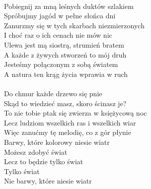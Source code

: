 \documentclass[a5paper, 10pt]{book}
\begin{document}
\begin{minipage}[t]{0.8\textwidth}
  \\
  Pobiegnij za mną leśnych duktów szlakiem\\
  Spróbujmy jagód w pełne słońca dni\\
  Zanurzmy się w tych skarbach niezmierzonych\\
  I choć raz o ich cenach nie mów nic\vspace*{1.5mm}\\
  Ulewa jest mą siostrą, strumień bratem\\
  A każde z żywych stworzeń to mój druh\\
  Jesteśmy połączonym z sobą światem\\
  A natura ten krąg życia wprawia w ruch\\
  \\
  \hspace*{8mm}Do chmur każde drzewo się pnie \\
  \hspace*{8mm}Skąd to wiedzieć masz, skoro ścinasz je?\vspace*{1.5mm}\\
  \hspace*{5mm}To nie tobie ptak się zwierza w księżycową noc\\
  \hspace*{5mm}Lecz ludziom wszelkich ras i wszelkich wiar\\
  \hspace*{5mm}Więc zanućmy tę melodię, co z gór płynie\\
  \hspace*{5mm}Barwy, które kolorowy niesie wiatr\vspace*{1.5mm}\\
  \hspace*{8mm}Możesz zdobyć świat\\
  \hspace*{8mm}Lecz to będzie tylko świat\\
  \hspace*{8mm}Tylko świat \\
  \hspace*{8mm}Nie barwy, które niesie wiatr \\

\end{minipage}
\end{document}
